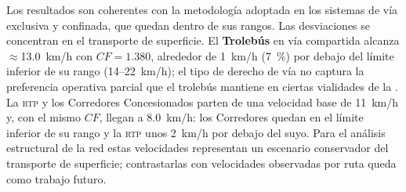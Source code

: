 Los resultados son coherentes con la metodología adoptada en los sistemas de vía
exclusiva y confinada, que quedan dentro de sus rangos. Las desviaciones se
concentran en el transporte de superficie. El \textbf{Trolebús} en vía
compartida alcanza $\approx$13.0~km/h con $CF = 1.380$, alrededor de 1~km/h (7\,
\%) por debajo del límite inferior de su rango (14--22~km/h); el tipo de derecho
de vía  no captura la preferencia operativa parcial que el
trolebús mantiene en ciertas vialidades de la \cdmx{}. La \textsc{rtp} y los
Corredores Concesionados parten de una velocidad base de 11~km/h y, con el mismo
$CF$, llegan a 8.0~km/h: los Corredores quedan en el límite inferior de su rango
y la \textsc{rtp} unos 2~km/h por debajo del suyo. Para el análisis estructural
de la red estas velocidades representan un escenario conservador del transporte
de superficie; contrastarlas con velocidades observadas por ruta queda como
trabajo futuro.
